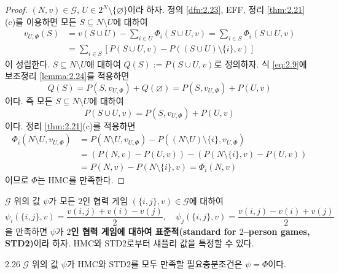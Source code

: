 \documentclass{article}
\numberwithin{equation}{section}
\begin{document}
\begin{proof}
	$(N,v)\in\mathcal G$, $U\in 2^N\setminus\{\varnothing\}$이라 하자. 정의 \ref{dfn:2.23}, EFF, 정리 \ref{thm:2.21}(c)를 이용하면 모든 $S\subseteq N\setminus U$에 대하여
	\begin{equation}
		\begin{aligned}
		\label{eq:2.9}
			v_{U,\Phi}(S)&=v(S\cup U)-\sum_{i\in U}\Phi_i(S\cup U,v)=\sum_{i\in S}\Phi_i(S\cup U,v)\\
			&=\sum_{i\in S}[P(S\cup U,v)-P((S\cup U)\setminus\{i\},v)]
		\end{aligned}
	\end{equation}
	이 성립한다. $S\subseteq N\setminus U$에 대하여 $Q(S):=P(S\cup U,v)$로 정의하자. 식 \ref{eq:2.9}에 보조정리 \ref{lemma:2.24}를 적용하면
	\[
		Q(S)=P(S,v_{U,\Phi})+Q(\varnothing)=P(S,v_{U,\Phi})+P(U,v)
	\]
	이다. 즉 모든 $S\subseteq N\setminus U$에 대하여
	\[
		P(S\cup U,v)=P(S,v_{U,\Phi})+P(U,v)
	\]
	이다. 정리 \ref{thm:2.21}(c)를 적용하면
	\[
		\begin{aligned}
			\Phi_i(N\setminus U,v_{U,\Phi})&=P(N\setminus U,v_{U,\Phi})-P((N\setminus U)\setminus\{i\},v_{U,\Phi})\\
			&=(P(N,v)-P(U,v))-(P(N\setminus\{i\},v)-P(U,v))\\
			&=P(N,v)-P(N\setminus\{i\},v)=\Phi_i(N,v)
		\end{aligned}
	\]
	이므로 $\Phi$는 HMC를 만족한다.
\end{proof}

$\mathcal G$ 위의 값 $\psi$가 모든 $2$인 협력 게임 $(\{i,j\},v)\in\mathcal G$에 대하여
\[
	\psi_i(\{i,j\},v)=\frac{v(i,j)+v(i)-v(j)}{2},\quad\psi_j(\{i,j\},v)=\frac{v(i,j)-v(i)+v(j)}{2}
\]
을 만족하면 $\psi$가 \textbf{$2$인 협력 게임에 대하여 표준적(standard for $2$--person games, STD2)}이라 하자. HMC와 STD2로부터 섀플리 값을 특정할 수 있다.

\begin{thm}{}{2.26}
	$\mathcal G$ 위의 값 $\psi$가 HMC와 STD2를 모두 만족할 필요충분조건은 $\psi=\Phi$이다.
\end{thm}
\end{document}
